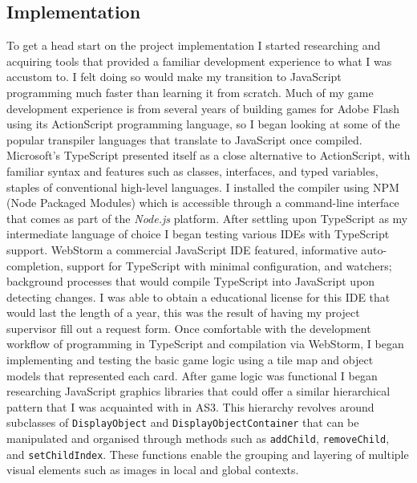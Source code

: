 \documentclass[final]{cmpreport}
\begin{document}
\subsection{Implementation}
To get a head start on the project implementation I started researching and acquiring tools that provided a familiar development experience to what I was accustom to. I felt doing so would make my transition to JavaScript programming much faster than learning it from scratch. Much of my game development experience is from several years of building games for Adobe Flash using its ActionScript programming language, so I began looking at some of the popular transpiler languages that translate to JavaScript once compiled. Microsoft's TypeScript presented itself as a close alternative to ActionScript, with familiar syntax and features such as classes, interfaces, and typed variables, staples of conventional high-level languages. I installed the compiler using NPM (Node Packaged Modules) which is accessible through a command-line interface that comes as part of the \textit{Node.js} platform. After settling upon TypeScript as my intermediate language of choice I began testing various IDEs with TypeScript support. WebStorm a commercial JavaScript IDE featured, informative auto-completion, support for TypeScript with minimal configuration, and watchers; background processes that would compile TypeScript into JavaScript upon detecting changes. I was able to obtain a educational license for this IDE that would last the length of a year, this was the result of having my project supervisor fill out a request form. Once comfortable with the development workflow of programming in TypeScript and compilation via WebStorm, I began implementing and testing the basic game logic using a tile map and object models that represented each card. After game logic was functional I began researching JavaScript graphics libraries that could offer a similar hierarchical pattern that I was acquainted with in AS3. This hierarchy revolves around subclasses of \texttt{DisplayObject} and \texttt{DisplayObjectContainer} that can be manipulated and organised through methods such as \texttt{addChild}, \texttt{removeChild}, and \texttt{setChildIndex}. These functions enable the grouping and layering of multiple visual elements such as images in local and global contexts.
\end{document}
